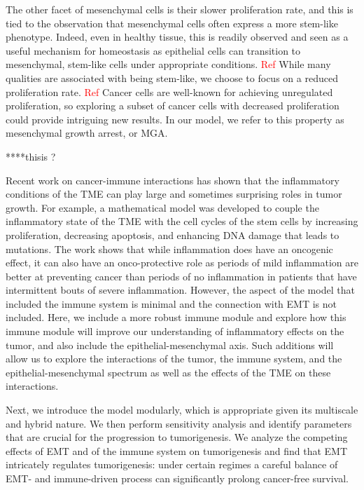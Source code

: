 \documentclass[11pt, preprint]{article}
\newcommand{\tcr} { \textcolor{red} }
\begin{document}
The other facet of mesenchymal cells is their slower proliferation rate, and this is tied to the observation that mesenchymal cells often express a more stem-like phenotype.
Indeed, even in healthy tissue, this is readily observed and seen as a useful mechanism for homeostasis as epithelial cells can transition to mesenchymal, stem-like cells under appropriate conditions. \tcr{Ref}
While many qualities are associated with being stem-like, we choose to focus on a reduced proliferation rate. \tcr{Ref}
Cancer cells are well-known for achieving unregulated proliferation, so exploring a subset of cancer cells with decreased proliferation could provide intriguing new results.
In our model, we refer to this property as mesenchymal growth arrest, or MGA.



****thisis ?

Recent work on cancer-immune interactions has shown that the inflammatory conditions of the TME can play large and sometimes surprising roles in tumor growth.
For example, a mathematical model was developed to couple the inflammatory state of the TME with the cell cycles of the stem cells by increasing proliferation, decreasing apoptosis, and enhancing DNA damage that leads to mutations\cite{guo2017multiscale}.
The work shows that while inflammation does have an oncogenic effect, it can also have an onco-protective role as periods of mild inflammation are better at preventing cancer than periods of no inflammation in patients that have intermittent bouts of severe inflammation.
However, the aspect of the model that included the immune system is minimal and the connection with EMT is not included.
Here, we include a more robust immune module and explore how this immune module will improve our understanding of inflammatory effects on the tumor, and also include the epithelial-mesenchymal axis.
Such additions will allow us to explore the interactions of the tumor, the immune system, and the epithelial-mesenchymal spectrum as well as the effects of the TME on these interactions.

Next, we introduce the model modularly, which is appropriate given its multiscale and hybrid nature.
We then perform sensitivity analysis and identify parameters that are crucial for the progression to tumorigenesis.
We analyze the competing effects of EMT and of the immune system on tumorigenesis and find that EMT intricately regulates tumorigenesis: under certain regimes a careful balance of EMT- and immune-driven process can significantly prolong cancer-free survival.
\end{document}
